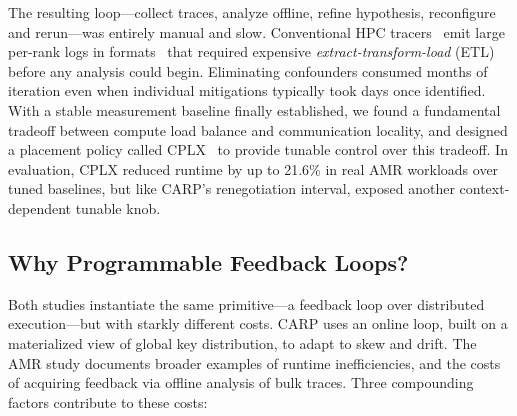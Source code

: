 The resulting loop---collect traces, analyze offline, refine hypothesis, reconfigure and
rerun---was entirely manual and slow.
Conventional HPC tracers~\cite{Shend2006:TAU,Knupf2012:Score-P} emit large per-rank logs in
formats~\cite{:ChromeJsonTEF,Eschw2012:OTF2}
that required expensive \emph{extract-transform-load} (ETL) before any analysis could begin.
Eliminating confounders consumed months of iteration even when individual mitigations typically
took days once identified.
With a stable measurement baseline finally established, we found a
fundamental tradeoff between compute load balance and communication locality, and designed a
placement policy called CPLX~\cite{Jain2025:AMR} to provide tunable control over this tradeoff.
In evaluation, CPLX reduced runtime by up to 21.6\% in real AMR workloads over tuned baselines, but
like
CARP's renegotiation interval, exposed another context-dependent tunable knob.

\enlargethispage{-\baselineskip}
\subsection{Why Programmable Feedback Loops?
}
\label{sec:intro:case:gap}

\enlargethispage{-\baselineskip}

Both studies instantiate the same primitive---a feedback loop over distributed execution---but
with starkly different costs.
CARP uses an online loop, built on a materialized view of global key distribution, to adapt to skew
and drift.
The AMR study documents broader examples of runtime inefficiencies, and the costs of
acquiring feedback via offline analysis of bulk traces.
Three compounding factors contribute to these costs:


